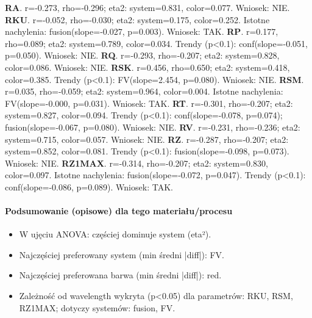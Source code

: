 \documentclass[
  10pt,
]{article}
\begin{document}
\textbf{RA}. r=-0.273, rho=-0.296; eta2: system=0.831, color=0.077.
Wniosek: NIE. \textbf{RKU}. r=-0.052, rho=-0.030; eta2: system=0.175,
color=0.252. Istotne nachylenia: fusion(slope=-0.027, p=0.003). Wniosek:
TAK. \textbf{RP}. r=0.177, rho=0.089; eta2: system=0.789, color=0.034.
Trendy (p\textless0.1): conf(slope=-0.051, p=0.050). Wniosek: NIE.
\textbf{RQ}. r=-0.293, rho=-0.207; eta2: system=0.828, color=0.086.
Wniosek: NIE. \textbf{RSK}. r=0.456, rho=0.650; eta2: system=0.418,
color=0.385. Trendy (p\textless0.1): FV(slope=2.454, p=0.080). Wniosek:
NIE. \textbf{RSM}. r=0.035, rho=-0.059; eta2: system=0.964, color=0.004.
Istotne nachylenia: FV(slope=-0.000, p=0.031). Wniosek: TAK.
\textbf{RT}. r=-0.301, rho=-0.207; eta2: system=0.827, color=0.094.
Trendy (p\textless0.1): conf(slope=-0.078, p=0.074);
fusion(slope=-0.067, p=0.080). Wniosek: NIE. \textbf{RV}. r=-0.231,
rho=-0.236; eta2: system=0.715, color=0.057. Wniosek: NIE. \textbf{RZ}.
r=-0.287, rho=-0.207; eta2: system=0.852, color=0.081. Trendy
(p\textless0.1): fusion(slope=-0.098, p=0.073). Wniosek: NIE.
\textbf{RZ1MAX}. r=-0.314, rho=-0.207; eta2: system=0.830, color=0.097.
Istotne nachylenia: fusion(slope=-0.072, p=0.047). Trendy
(p\textless0.1): conf(slope=-0.086, p=0.089). Wniosek: TAK.

\paragraph{Podsumowanie (opisowe) dla tego materiału/procesu}
\begin{itemize}
\item W ujęciu ANOVA: częściej dominuje system (eta²).
\item Najczęściej preferowany system (min średni |diff|): FV.
\item Najczęściej preferowana barwa (min średni |diff|): red.
\item Zależność od wavelength wykryta (p<0.05) dla parametrów: RKU, RSM, RZ1MAX; dotyczy systemów: fusion, FV.
\end{itemize}
\end{document}
